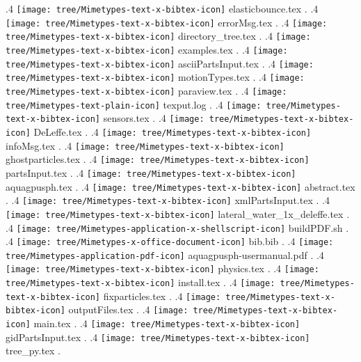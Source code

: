 {.4 { \texttt{[image: tree/Mimetypes-text-x-bibtex-icon]} elasticbounce.tex }.
.4 { \texttt{[image: tree/Mimetypes-text-x-bibtex-icon]} errorMsg.tex }.
.4 { \texttt{[image: tree/Mimetypes-text-x-bibtex-icon]} directory\_tree.tex }.
.4 { \texttt{[image: tree/Mimetypes-text-x-bibtex-icon]} examples.tex }.
.4 { \texttt{[image: tree/Mimetypes-text-x-bibtex-icon]} asciiPartsInput.tex }.
.4 { \texttt{[image: tree/Mimetypes-text-x-bibtex-icon]} motionTypes.tex }.
.4 { \texttt{[image: tree/Mimetypes-text-x-bibtex-icon]} paraview.tex }.
.4 { \texttt{[image: tree/Mimetypes-text-plain-icon]} texput.log }.
.4 { \texttt{[image: tree/Mimetypes-text-x-bibtex-icon]} sensors.tex }.
.4 { \texttt{[image: tree/Mimetypes-text-x-bibtex-icon]} DeLeffe.tex }.
.4 { \texttt{[image: tree/Mimetypes-text-x-bibtex-icon]} infoMsg.tex }.
.4 { \texttt{[image: tree/Mimetypes-text-x-bibtex-icon]} ghostparticles.tex }.
.4 { \texttt{[image: tree/Mimetypes-text-x-bibtex-icon]} partsInput.tex }.
.4 { \texttt{[image: tree/Mimetypes-text-x-bibtex-icon]} aquagpusph.tex }.
.4 { \texttt{[image: tree/Mimetypes-text-x-bibtex-icon]} abstract.tex }.
.4 { \texttt{[image: tree/Mimetypes-text-x-bibtex-icon]} xmlPartsInput.tex }.
.4 { \texttt{[image: tree/Mimetypes-text-x-bibtex-icon]} lateral\_water\_1x\_deleffe.tex }.
.4 { \texttt{[image: tree/Mimetypes-application-x-shellscript-icon]} buildPDF.sh }.
.4 { \texttt{[image: tree/Mimetypes-x-office-document-icon]} bib.bib }.
.4 { \texttt{[image: tree/Mimetypes-application-pdf-icon]} aquagpusph-usermanual.pdf }.
.4 { \texttt{[image: tree/Mimetypes-text-x-bibtex-icon]} physics.tex }.
.4 { \texttt{[image: tree/Mimetypes-text-x-bibtex-icon]} install.tex }.
.4 { \texttt{[image: tree/Mimetypes-text-x-bibtex-icon]} fixparticles.tex }.
.4 { \texttt{[image: tree/Mimetypes-text-x-bibtex-icon]} outputFiles.tex }.
.4 { \texttt{[image: tree/Mimetypes-text-x-bibtex-icon]} main.tex }.
.4 { \texttt{[image: tree/Mimetypes-text-x-bibtex-icon]} gidPartsInput.tex }.
.4 { \texttt{[image: tree/Mimetypes-text-x-bibtex-icon]} tree\_py.tex }.
}
